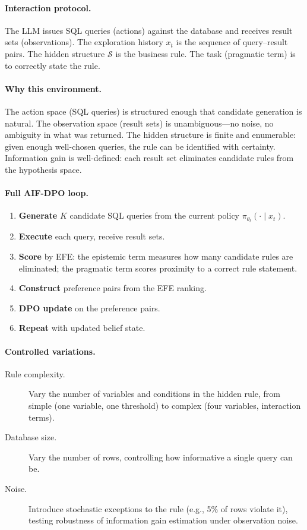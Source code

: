 \documentclass[11pt]{article}
\begin{document}
\paragraph{Interaction protocol.}
The LLM issues SQL queries (actions) against the database and receives result sets (observations). The exploration history $x_t$ is the sequence of query--result pairs. The hidden structure $\mathcal{S}$ is the business rule. The task (pragmatic term) is to correctly state the rule.

\paragraph{Why this environment.}
The action space (SQL queries) is structured enough that candidate generation is natural. The observation space (result sets) is unambiguous---no noise, no ambiguity in what was returned. The hidden structure is finite and enumerable: given enough well-chosen queries, the rule can be identified with certainty. Information gain is well-defined: each result set eliminates candidate rules from the hypothesis space.

\paragraph{Full AIF-DPO loop.}
\begin{enumerate}
    \item \textbf{Generate} $K$ candidate SQL queries from the current policy $\pi_{\theta_t}(\cdot \mid x_t)$.
    \item \textbf{Execute} each query, receive result sets.
    \item \textbf{Score} by EFE: the epistemic term measures how many candidate rules are eliminated; the pragmatic term scores proximity to a correct rule statement.
    \item \textbf{Construct} preference pairs from the EFE ranking.
    \item \textbf{DPO update} on the preference pairs.
    \item \textbf{Repeat} with updated belief state.
\end{enumerate}

\paragraph{Controlled variations.}
\begin{description}
    \item[Rule complexity.] Vary the number of variables and conditions in the hidden rule, from simple (one variable, one threshold) to complex (four variables, interaction terms).
    \item[Database size.] Vary the number of rows, controlling how informative a single query can be.
    \item[Noise.] Introduce stochastic exceptions to the rule (e.g., 5\% of rows violate it), testing robustness of information gain estimation under observation noise.
\end{description}
\end{document}
